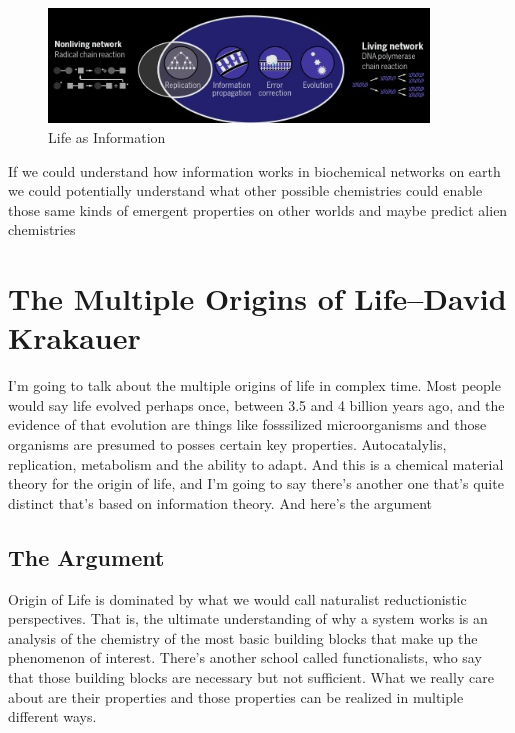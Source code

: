 \documentclass[]{article}
\begin{document}
\begin{figure}[H]
	\caption[Life as Information]{Life as Information\cite{cronin2016beyond}}\label{fig:LifeInformation}
	\includegraphics[width=0.9\textwidth]{LifeInformation}
\end{figure}


If we could understand how information works in biochemical networks on earth we could potentially understand what other possible chemistries could enable those same kinds of emergent properties on other worlds and maybe predict alien chemistries

\section[The Multiple Origins of Life]{The Multiple Origins of Life--David Krakauer}

I'm going to talk about the multiple origins of life in complex time. Most people would say life evolved perhaps once, between 3.5 and 4 billion years ago, and the evidence of that evolution are things like fosssilized microorganisms and those organisms are presumed to posses certain key properties. Autocatalylis, replication, metabolism and the ability to adapt. And this is a chemical material theory for the origin of life, and I'm going to say there's another one that's quite distinct that's based on information theory. And here's the argument

\subsection{The Argument}

Origin of Life is dominated by what we would call naturalist reductionistic perspectives. That is, the ultimate understanding of why a system works is an analysis of the chemistry of the most basic building blocks that make up the phenomenon of interest. There's another school called functionalists, who say that those building blocks are necessary but not sufficient. What we really care about are their properties and those properties can be realized in multiple different ways. 
\end{document}
